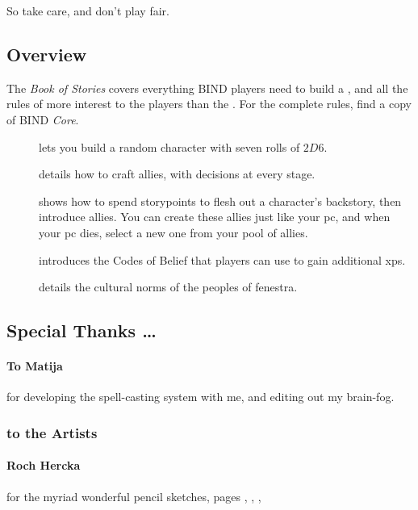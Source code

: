 \begin{multicols}{2}
So take care, and don't play fair.

\subsection*{Overview}

The \textit{Book of Stories} covers everything BIND players need to build a , and all the rules of more interest to the players than the .
For the complete rules, find a copy of BIND \textit{Core}.

\begin{description}
  \item[]
  lets you build a random character with seven rolls of $2D6$.
  \item[]
  details how to craft allies, with decisions at every stage.
  \item[] shows how to spend \glspl{storypoint} to flesh out a character's backstory, then introduce allies.
  You can create these allies just like your \gls{pc}, and when your \gls{pc} dies, select a new one from your pool of allies.
  \item[] introduces the Codes of Belief that players can use to gain additional \glspl{xp}.
  \item[] details the cultural norms of the peoples of \gls{fenestra}.
\end{description}

\subsection*{Special Thanks \ldots}

\paragraph{To Matija}
for developing the spell-casting system with me, and editing out my brain-fog.

\subsubsection*{to the Artists}

\paragraph{Roch Hercka} for the myriad wonderful pencil sketches, pages 
\pageref{Roch_Hercka/five_races}, 
\pageref{Roch_Hercka/xp-1}, 
\pageref{Roch_Hercka/xp-2}, 


\end{multicols}
